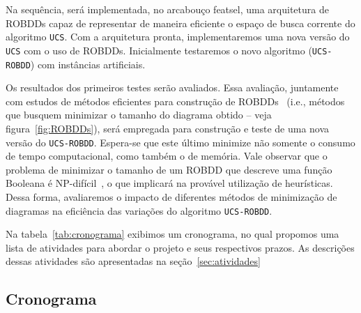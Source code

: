 \documentclass[12pt]{article}
\begin{document}
Na sequência, será implementada, no arcabouço featsel, uma arquitetura de ROBDDs capaz de representar de maneira eficiente o espaço de busca corrente do algoritmo {\tt UCS}. Com a arquitetura pronta, implementaremos uma nova versão do {\tt UCS} com o uso de ROBDDs. Inicialmente testaremos o novo algoritmo ({\tt UCS-ROBDD}) com instâncias artificiais.

Os resultados dos primeiros testes serão avaliados. Essa avaliação, juntamente com estudos de métodos eficientes para construção de ROBDDs~\cite{rice,brace} (i.e., métodos que busquem minimizar o tamanho do diagrama obtido -- veja figura~\ref{fig:ROBDDs}), será empregada para construção e teste de uma nova versão do {\tt UCS-ROBDD}. Espera-se que este último minimize não somente o consumo de tempo computacional, como também o de memória. Vale observar que o problema de minimizar o tamanho de um ROBDD que descreve uma função Booleana é NP-difícil~\cite{rice}, o que implicará na provável utilização de heurísticas. Dessa forma, avaliaremos o impacto de diferentes métodos de minimização de diagramas na eficiência das variações do algoritmo {\tt UCS-ROBDD}.


Na tabela~\ref{tab:cronograma} exibimos um cronograma, no qual propomos uma lista de atividades para abordar o projeto e seus respectivos prazos. As descrições dessas atividades são apresentadas na seção~\ref{sec:atividades}


\subsection{Cronograma}
\end{document}
